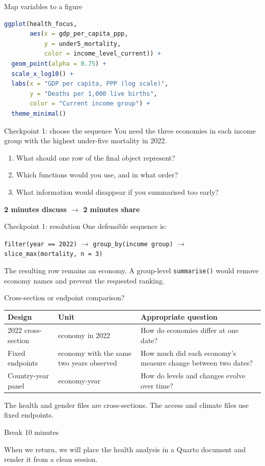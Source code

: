 \begin{frame}[fragile]{Map variables to a figure}
\begin{lstlisting}[language=R]
ggplot(health_focus,
       aes(x = gdp_per_capita_ppp,
           y = under5_mortality,
           color = income_level_current)) +
  geom_point(alpha = 0.75) +
  scale_x_log10() +
  labs(x = "GDP per capita, PPP (log scale)",
       y = "Deaths per 1,000 live births",
       color = "Current income group") +
  theme_minimal()
\end{lstlisting}
\end{frame}

\begin{frame}{Checkpoint 1: choose the sequence}
You need the three economies in each income group with the highest under-five mortality in 2022.
\vspace{0.3cm}
\begin{enumerate}
\item What should one row of the final object represent?
\item Which functions would you use, and in what order?
\item What information would disappear if you summarised too early?
\end{enumerate}
\vfill
\centering\textbf{2 minutes discuss \(\longrightarrow\) 2 minutes share}
\end{frame}

\begin{frame}{Checkpoint 1: resolution}
One defensible sequence is:
\vspace{0.3cm}
\begin{center}
\texttt{filter(year == 2022)} \(\rightarrow\)
\texttt{group\_by(income group)} \(\rightarrow\)
\texttt{slice\_max(mortality, n = 3)}
\end{center}
\vspace{0.4cm}
The resulting row remains an economy. A group-level \texttt{summarise()} would remove economy names and prevent the requested ranking.
\end{frame}

\begin{frame}{Cross-section or endpoint comparison?}
\small
\begin{tabularx}{\textwidth}{p{2.6cm} X X}
\toprule
Design & Unit & Appropriate question \\
\midrule
2022 cross-section & economy in 2022 & How do economies differ at one date? \\
Fixed endpoints & economy with the same two years observed & How much did each economy's measure change between two dates? \\
Country-year panel & economy-year & How do levels and changes evolve over time? \\
\bottomrule
\end{tabularx}
\vspace{0.35cm}
The health and gender files are cross-sections. The access and climate files use fixed endpoints.
\end{frame}

\begin{frame}{Break}
\centering
\vfill
{\Huge\color{crimson}10 minutes}
\vspace{0.5cm}

When we return, we will place the health analysis in a Quarto document and render it from a clean session.
\vfill
\end{frame}
